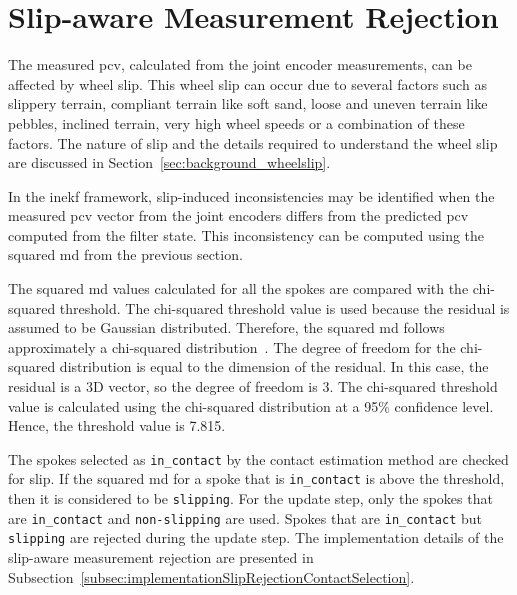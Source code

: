 \documentclass[report.tex]{subfiles}
\begin{document}
        \section{Slip-aware Measurement Rejection} \label{sec:sliprejection}
        
        The measured \gls{pcv}, calculated from the joint encoder measurements, can be affected by wheel slip. This wheel slip can occur due to several factors such as slippery terrain, compliant terrain like soft sand, loose and uneven terrain like pebbles, inclined terrain, very high wheel speeds or a combination of these factors. The nature of slip and the details required to understand the wheel slip are discussed in Section~\ref{sec:background_wheelslip}. 
        
        In the \gls{inekf} framework, slip-induced inconsistencies may be identified when the measured \gls{pcv} vector from the joint encoders differs from the predicted \gls{pcv} computed from the filter state. This inconsistency can be computed using the squared \gls{md} from the previous section. 
                
        The squared \gls{md} values calculated for all the spokes are compared with the chi-squared threshold. The chi-squared threshold value is used because the residual is assumed to be Gaussian distributed. Therefore, the squared \gls{md} follows approximately a chi-squared distribution~\cite{barshalom2001estimation,chen2023kalman}. The degree of freedom for the chi-squared distribution is equal to the dimension of the residual. In this case, the residual is a 3D vector, so the degree of freedom is 3. The chi-squared threshold value is calculated using the chi-squared distribution at a 95\% confidence level. Hence, the threshold value is 7.815. 
        
        The spokes selected as \texttt{in\_contact} by the contact estimation method are checked for slip. If the squared \gls{md} for a spoke that is \texttt{in\_contact} is above the threshold, then it is considered to be \texttt{slipping}. For the update step, only the spokes that are \texttt{in\_contact} and \texttt{non-slipping} are used. Spokes that are \texttt{in\_contact} but \texttt{slipping} are rejected during the update step. The implementation details of the slip-aware measurement rejection are presented in Subsection~\ref{subsec:implementationSlipRejectionContactSelection}. 
    
\end{document}
